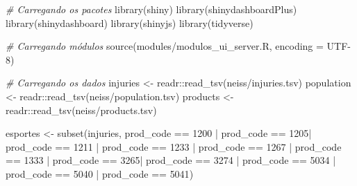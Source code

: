\documentclass[
]{book}
\newenvironment{Shaded}{\begin{snugshade}}{\end{snugshade}}
\newcommand{\AttributeTok}[1]{\textcolor[rgb]{0.77,0.63,0.00}{#1}}
\newcommand{\CommentTok}[1]{\textcolor[rgb]{0.56,0.35,0.01}{\textit{#1}}}
\newcommand{\DecValTok}[1]{\textcolor[rgb]{0.00,0.00,0.81}{#1}}
\newcommand{\FunctionTok}[1]{\textcolor[rgb]{0.00,0.00,0.00}{#1}}
\newcommand{\NormalTok}[1]{#1}
\newcommand{\OtherTok}[1]{\textcolor[rgb]{0.56,0.35,0.01}{#1}}
\newcommand{\SpecialCharTok}[1]{\textcolor[rgb]{0.00,0.00,0.00}{#1}}
\newcommand{\StringTok}[1]{\textcolor[rgb]{0.31,0.60,0.02}{#1}}
\begin{document}
\begin{Shaded}
\begin{Highlighting}[]
\CommentTok{\# Carregando os pacotes}
\FunctionTok{library}\NormalTok{(shiny)}
\FunctionTok{library}\NormalTok{(shinydashboardPlus)}
\FunctionTok{library}\NormalTok{(shinydashboard)}
\FunctionTok{library}\NormalTok{(shinyjs)}
\FunctionTok{library}\NormalTok{(tidyverse)}

\CommentTok{\# Carregando módulos }
\FunctionTok{source}\NormalTok{(}\StringTok{\textquotesingle{}modules/modulos\_ui\_server.R\textquotesingle{}}\NormalTok{, }\AttributeTok{encoding =} \StringTok{\textquotesingle{}UTF{-}8\textquotesingle{}}\NormalTok{)}

\CommentTok{\# Carregando os dados }
\NormalTok{injuries }\OtherTok{\textless{}{-}}\NormalTok{ readr}\SpecialCharTok{::}\FunctionTok{read\_tsv}\NormalTok{(}\StringTok{\textquotesingle{}neiss/injuries.tsv\textquotesingle{}}\NormalTok{)}
\NormalTok{population }\OtherTok{\textless{}{-}}\NormalTok{ readr}\SpecialCharTok{::}\FunctionTok{read\_tsv}\NormalTok{(}\StringTok{\textquotesingle{}neiss/population.tsv\textquotesingle{}}\NormalTok{) }
\NormalTok{products }\OtherTok{\textless{}{-}}\NormalTok{ readr}\SpecialCharTok{::}\FunctionTok{read\_tsv}\NormalTok{(}\StringTok{\textquotesingle{}neiss/products.tsv\textquotesingle{}}\NormalTok{)}

\NormalTok{esportes }\OtherTok{\textless{}{-}} \FunctionTok{subset}\NormalTok{(injuries, prod\_code }\SpecialCharTok{==} \DecValTok{1200} \SpecialCharTok{|}\NormalTok{ prod\_code }\SpecialCharTok{==} \DecValTok{1205}\SpecialCharTok{|}\NormalTok{ prod\_code }\SpecialCharTok{==} \DecValTok{1211} \SpecialCharTok{|}
\NormalTok{                     prod\_code }\SpecialCharTok{==} \DecValTok{1233} \SpecialCharTok{|}\NormalTok{ prod\_code }\SpecialCharTok{==} \DecValTok{1267} \SpecialCharTok{|}\NormalTok{ prod\_code }\SpecialCharTok{==} \DecValTok{1333} \SpecialCharTok{|}\NormalTok{ prod\_code }\SpecialCharTok{==} \DecValTok{3265}\SpecialCharTok{|}
\NormalTok{                     prod\_code }\SpecialCharTok{==} \DecValTok{3274} \SpecialCharTok{|}\NormalTok{ prod\_code }\SpecialCharTok{==} \DecValTok{5034} \SpecialCharTok{|}\NormalTok{ prod\_code }\SpecialCharTok{==} \DecValTok{5040} \SpecialCharTok{|}\NormalTok{ prod\_code }\SpecialCharTok{==} \DecValTok{5041}\NormalTok{)}


\end{Highlighting}
\end{Shaded}
\end{document}
